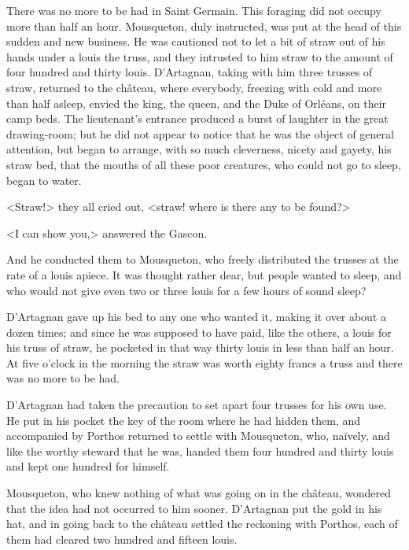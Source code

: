 There was no more to be had in Saint Germain. This foraging did not occupy more than half an hour. Mousqueton, duly instructed, was put at the head of this sudden and new business. He was cautioned not to let a bit of straw out of his hands under a louis the truss, and they intrusted to him straw to the amount of four hundred and thirty louis. D'Artagnan, taking with him three trusses of straw, returned to the château, where everybody, freezing with cold and more than half asleep, envied the king, the queen, and the Duke of Orléans, on their camp beds. The lieutenant's entrance produced a burst of laughter in the great drawing-room; but he did not appear to notice that he was the object of general attention, but began to arrange, with so much cleverness, nicety and gayety, his straw bed, that the mouths of all these poor creatures, who could not go to sleep, began to water.

<Straw!> they all cried out, <straw! where is there any to be found?>

<I can show you,> answered the Gascon.

And he conducted them to Mousqueton, who freely distributed the trusses at the rate of a louis apiece. It was thought rather dear, but people wanted to sleep, and who would not give even two or three louis for a few hours of sound sleep?

D'Artagnan gave up his bed to any one who wanted it, making it over about a dozen times; and since he was supposed to have paid, like the others, a louis for his truss of straw, he pocketed in that way thirty louis in less than half an hour. At five o'clock in the morning the straw was worth eighty francs a truss and there was no more to be had.

D'Artagnan had taken the precaution to set apart four trusses for his own use. He put in his pocket the key of the room where he had hidden them, and accompanied by Porthos returned to settle with Mousqueton, who, naïvely, and like the worthy steward that he was, handed them four hundred and thirty louis and kept one hundred for himself.

Mousqueton, who knew nothing of what was going on in the château, wondered that the idea had not occurred to him sooner. D'Artagnan put the gold in his hat, and in going back to the château settled the reckoning with Porthos, each of them had cleared two hundred and fifteen louis.

